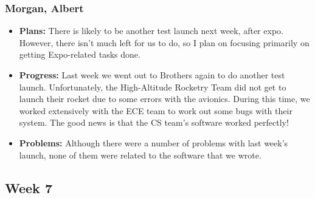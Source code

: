 \documentclass[10pt,draftclsnofoot,onecolumn]{IEEEtran}
\begin{document}
\subsubsection{Morgan, Albert}
\begin{itemize}
	\item \textbf{Plans: }
	There is likely to be another test launch next week, after expo. However, there isn't much left for us to do, so I plan on focusing primarily on getting Expo-related tasks done.
	\item \textbf{Progress: }
	Last week we went out to Brothers again to do another test launch. Unfortunately, the High-Altitude Rocketry Team did not get to launch their rocket due to some errors with the avionics. During this time, we worked extensively with the ECE team to work out some bugs with their system. The good news is that the CS team's software worked perfectly!
	\item \textbf{Problems: }
	Although there were a number of problems with last week's launch, none of them were related to the software that we wrote.
\end{itemize}

\subsection{Week 7}
\end{document}

